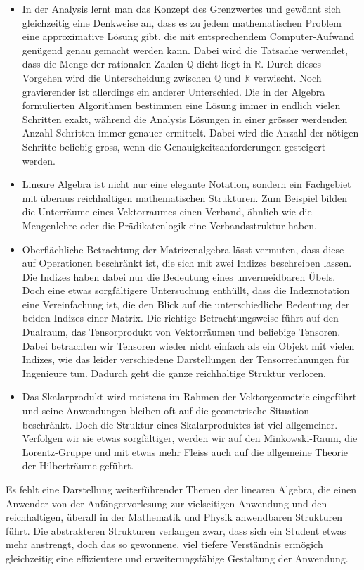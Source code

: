 \begin{itemize}
\item
In der Analysis lernt man das Konzept des Grenzwertes und gewöhnt
sich gleichzeitig eine Denkweise an, dass es zu jedem mathematischen Problem
eine approximative Lösung gibt, die mit entsprechendem Computer-Aufwand
genügend genau gemacht werden kann.
Dabei wird die Tatsache verwendet, dass die Menge der rationalen Zahlen
$\mathbb Q$ dicht liegt in $\mathbb R$.
Durch dieses Vorgehen wird die Unterscheidung zwischen $\mathbb Q$ und
$\mathbb R$ verwischt.
Noch gravierender ist allerdings ein anderer Unterschied.
Die in der Algebra formulierten Algorithmen bestimmen eine Lösung immer
in endlich vielen Schritten exakt, während die Analysis Lösungen in
einer grösser werdenden Anzahl Schritten immer genauer ermittelt.
Dabei wird die Anzahl der nötigen Schritte beliebig gross, wenn die
Genauigkeitsanforderungen gesteigert werden.
\item
Lineare Algebra ist nicht nur eine elegante Notation, sondern ein
Fachgebiet mit überaus reichhaltigen mathematischen Strukturen.
Zum Beispiel bilden die Unterräume eines Vektorraumes einen Verband,
ähnlich wie die Mengenlehre oder die Prädikatenlogik eine
Verbandsstruktur haben.
\item
Oberflächliche Betrachtung der Matrizenalgebra lässt vermuten, dass diese
auf Operationen beschränkt ist, die sich mit zwei Indizes beschreiben
lassen.
Die Indizes haben dabei nur die Bedeutung eines unvermeidbaren Übels.
Doch eine etwas sorgfältigere Untersuchung enthüllt, dass die Indexnotation
eine Vereinfachung ist, die den Blick auf die unterschiedliche Bedeutung
der beiden Indizes einer Matrix.
Die richtige Betrachtungsweise führt auf den Dualraum, das Tensorprodukt
von Vektorräumen und beliebige Tensoren.
Dabei betrachten wir Tensoren wieder nicht einfach als ein Objekt mit
vielen Indizes, wie das leider verschiedene Darstellungen der Tensorrechnungen
für Ingenieure tun.
Dadurch geht die ganze reichhaltige Struktur verloren.
\item
Das Skalarprodukt wird meistens im Rahmen der Vektorgeometrie 
eingeführt und seine Anwendungen bleiben oft auf die geometrische
Situation beschränkt.
Doch die Struktur eines Skalarproduktes ist viel allgemeiner.
Verfolgen wir sie etwas sorgfältiger, werden wir auf den Minkowski-Raum,
die Lorentz-Gruppe und mit etwas mehr Fleiss auch auf die allgemeine Theorie
der Hilberträume geführt.
\end{itemize}
Es fehlt eine Darstellung weiterführender Themen der linearen
Algebra, die einen Anwender von der Anfängervorlesung zur vielseitigen
Anwendung und den reichhaltigen, überall in der Mathematik und Physik
anwendbaren Strukturen führt.
Die abstrakteren Strukturen verlangen zwar, dass sich ein Student
etwas mehr anstrengt, doch das so gewonnene, viel tiefere Verständnis
ermögich gleichzeitig eine effizientere und erweiterungsfähige 
Gestaltung der Anwendung.


